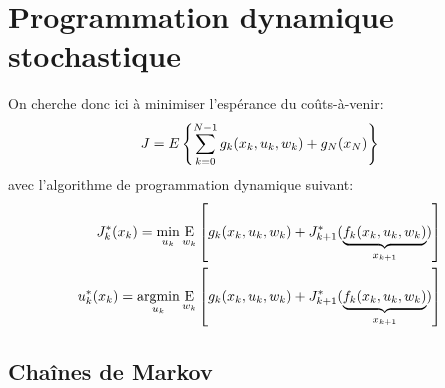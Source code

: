 \newpage
\section{Programmation dynamique stochastique}


On cherche donc ici à minimiser l'espérance du coûts-à-venir:
\begin{align}
    J = \large{E} \left\{ \sum_{k=0}^{N-1} g_k(x_k, u_k , w_k) + g_N( x_N ) \right\}
\end{align}
avec l'algorithme de programmation dynamique suivant:
\begin{align}
J^*_k(x_k) = 
\operatornamewithlimits{min}\limits_{u_k}
\operatornamewithlimits{E}\limits_{w_k}
\left[
g_k(x_k , u_k , w_k ) + J^*_{k+1}( 
\underbrace{
f_k(x_k , u_k , w_k ) 
}_{x_{k+1}}
)
\right] \\
u^*_k(x_k) = 
\operatornamewithlimits{argmin}\limits_{u_k}
\operatornamewithlimits{E}\limits_{w_k}
\left[
g_k(x_k , u_k , w_k) + J^*_{k+1}( 
\underbrace{
f_k(x_k , u_k , w_k) 
}_{x_{k+1}}
)
\right] 
\end{align} 


\subsection{Chaînes de Markov}
